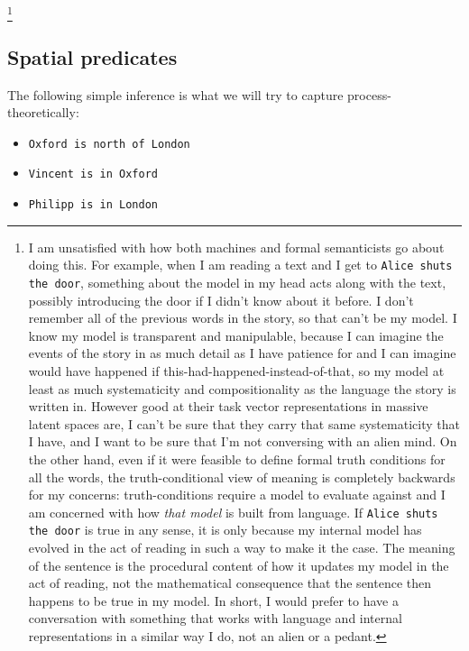 \footnote{I am unsatisfied with how both machines and formal semanticists go about doing this. For example, when I am reading a text and I get to \texttt{Alice shuts the door}, something about the model in my head acts along with the text, possibly introducing the door if I didn't know about it before. I don't remember all of the previous words in the story, so that can't be my model. I know my model is transparent and manipulable, because I can imagine the events of the story in as much detail as I have patience for and I can imagine would have happened if this-had-happened-instead-of-that, so my model at least as much systematicity and compositionality as the language the story is written in. However good at their task vector representations in massive latent spaces are, I can't be sure that they carry that same systematicity that I have, and I want to be sure that I'm not conversing with an alien mind. On the other hand, even if it were feasible to define formal truth conditions for all the words, the truth-conditional view of meaning is completely backwards for my concerns: truth-conditions require a model to evaluate against and I am concerned with how \emph{that model} is built from language. If \texttt{Alice shuts the door} is true in any sense, it is only because my internal model has evolved in the act of reading in such a way to make it the case. The meaning of the sentence is the procedural content of how it updates my model in the act of reading, not the mathematical consequence that the sentence then happens to be true in my model. In short, I would prefer to have a conversation with something that works with language and internal representations in a similar way I do, not an alien or a pedant.}





\subsection{Spatial predicates}

The following simple inference is what we will try to capture process-theoretically:

\begin{itemize}
\item \texttt{Oxford is north of London}
\item \texttt{Vincent is in Oxford}
\item \texttt{Philipp is in London}
\end{itemize}

